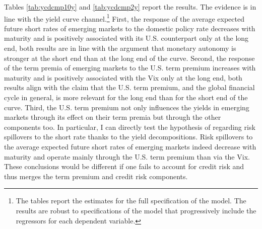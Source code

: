 {Tables \ref{tab:ycdcmp10y} and \ref{tab:ycdcmp2y} report the results.
The evidence is in line with the yield curve channel.\footnote{ The tables report the estimates for the full specification of the model. The results are robust to specifications of the model that progressively include the regressors for each dependent variable.} 
First, the response of the average expected future short rates of emerging markets to the domestic policy rate decreases with maturity and is positively associated with its U.S. counterpart only at the long end, both results are in line with the argument that monetary autonomy is stronger at the short end than at the long end of the curve.
Second, the response of the term premia of emerging markets to the U.S. term premium increases with maturity and is positively associated with the Vix only at the long end, both results align with the claim that the U.S. term premium, and the global financial cycle in general, is more relevant for the long end than for the short end of the curve. 
Third, the U.S. term premium not only influences the yields in emerging markets through its effect on their term premia but through the other components too.
In particular, I can directly test the hypothesis of \cite{Kalemli-Ozcan:2019} regarding risk spillovers to the short rate thanks to the yield decompositions.
Risk spillovers to the average expected future short rates of emerging markets indeed decrease with maturity and operate mainly through 
the U.S. term premium than via the Vix.
These conclusions would be different if one fails to account for credit risk and thus merges the term premium and credit risk components.

%	







}
